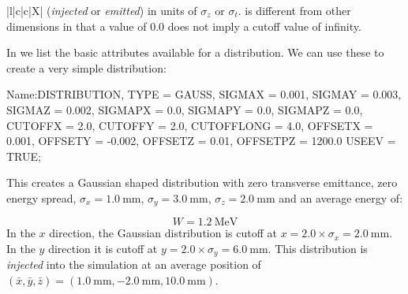 \begin{table}[!htb]
\begin{center}
\begin{tabularx}{\textwidth-1cm}{|l|c|c|X|}
{      (\emph{injected} or \emph{emitted}) in units of $\sigma_{z}$ or $\sigma_{t}$.  is
      different from other dimensions in that a value of \num{0.0} does not imply a cutoff value of infinity.}
      \hline
    \end{tabularx}
  \end{center}
\end{table}

In  we list the basic attributes available for a  distribution. We
can use these to create a very simple  distribution:

\begin{example}
Name:DISTRIBUTION, TYPE = GAUSS,
                   SIGMAX = 0.001,
                   SIGMAY = 0.003,
                   SIGMAZ = 0.002,
                   SIGMAPX = 0.0,
                   SIGMAPY = 0.0,
                   SIGMAPZ = 0.0,
                   CUTOFFX = 2.0,
                   CUTOFFY = 2.0,
                   CUTOFFLONG = 4.0,
                   OFFSETX = 0.001,
                   OFFSETY = -0.002,
                   OFFSETZ = 0.01,
                   OFFSETPZ = 1200.0
                   USEEV = TRUE;
\end{example}
This creates a Gaussian shaped distribution with zero transverse emittance, zero energy spread, $\sigma_{x} = \SI{1.0}{\milli\meter}$,
$\sigma_{y} = \SI{3.0}{\milli\meter}$, $\sigma_{z} = \SI{2.0}{\milli\meter}$ and an average energy of:

\begin{equation*}
W = \SI{1.2}{\mega\electronvolt}
\end{equation*}
In the $x$ direction, the Gaussian distribution is cutoff at $x = 2.0 \times \sigma_{x} = \SI{2.0}{\milli\meter}$. In the $y$
direction it is cutoff at $y = 2.0 \times \sigma_{y} = \SI{6.0}{\milli\meter}$. This distribution is \emph{injected} into the simulation
at an average position of $(\bar{x},\bar{y},\bar{z})=(\SI{1.0}{\milli\meter}, \SI{-2.0}{\milli\meter}, \SI{10.0}{\milli\meter})$.



